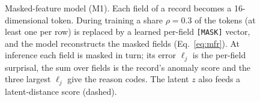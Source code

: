 \begin{figure}[t]
{%
}
\caption{Masked-feature model (M1). Each field of a record becomes a
16-dimensional token. During training a share $\rho = 0.3$ of the tokens (at
least one per row) is replaced by a learned per-field \texttt{[MASK]} vector,
and the model reconstructs the masked fields (Eq.~\eqref{eq:mfr}). At
inference each field is masked in turn; its error $\ell_j$ is the per-field
surprisal, the sum over fields is the record's anomaly score and the three
largest $\ell_j$ give the reason codes. The latent $z$ also feeds a
latent-distance score (dashed).}
\label{fig:architecture}
\end{figure}
